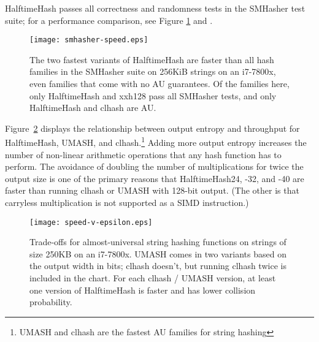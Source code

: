 \documentclass{llncs}
\begin{document}
HalftimeHash passes all correctness and randomness tests in the SMHasher test suite; for a performance comparison, see Figure \ref{smhasher-speed} and \cite{smhasher}.

\begin{figure}
  \texttt{[image: smhasher-speed.eps]}
\caption{
  \label{smhasher-speed}
    The two fastest variants of HalftimeHash are faster than all hash families in the SMHasher suite on 256KiB strings on an i7-7800x, even families that come with no AU guarantees. \protect\cite{smhasher}
    Of the families here, only HalftimeHash and xxh128 pass all SMHasher tests, and only HalftimeHash and clhash are AU.
}
\end{figure}

Figure~\ref{frontier} displays the relationship between output entropy and throughput for HalftimeHash, UMASH, and clhash.\footnote{UMASH and clhash are the fastest AU families for string hashing}
Adding more output entropy increases the number of non-linear arithmetic operations that any hash function has to perform.\cite{ehc-nandi}
The avoidance of doubling the number of multiplications for twice the output size is one of the primary reasons that HalftimeHash24, -32, and -40 are faster than running clhash or UMASH with 128-bit output.
(The other is that carryless multiplication is not supported as a SIMD instruction.)

\begin{figure}
\texttt{[image: speed-v-epsilon.eps]}
\caption{
  \label{frontier}
  Trade-offs for almost-universal string hashing functions on strings of size 250KB on an i7-7800x.
  UMASH comes in two variants based on the output width in bits; clhash doesn't, but running clhash twice is included in the chart.
  For each clhash / UMASH version, at least one version of HalftimeHash is faster and has lower collision probability. \protect\cite{layer-of-maxima}
}
\end{figure}
\end{document}
